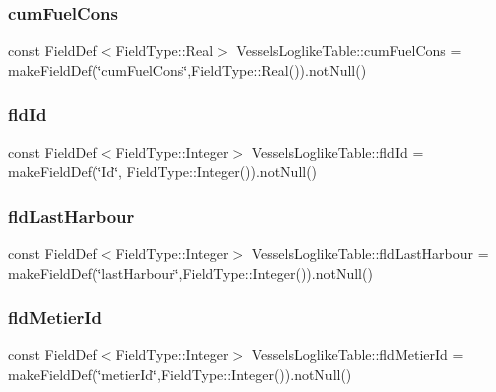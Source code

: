 \mbox{\label{class_vessels_loglike_table_a735694ec1f64a2f3a67e6a72e7d709ad}} 
\subsubsection{\texorpdfstring{cumFuelCons}{cumFuelCons}}
{\footnotesize\ttfamily const Field\+Def$<$Field\+Type\+::\+Real$>$ Vessels\+Loglike\+Table\+::cum\+Fuel\+Cons = make\+Field\+Def(\char`\"{}cum\+Fuel\+Cons\char`\"{},Field\+Type\+::\+Real()).not\+Null()}

\mbox{\label{class_vessels_loglike_table_a2009922216ad19cc583f4ca8a9e40500}} 
\subsubsection{\texorpdfstring{fldId}{fldId}}
{\footnotesize\ttfamily const Field\+Def$<$Field\+Type\+::\+Integer$>$ Vessels\+Loglike\+Table\+::fld\+Id = make\+Field\+Def(\char`\"{}Id\char`\"{}, Field\+Type\+::\+Integer()).not\+Null()}

\mbox{\label{class_vessels_loglike_table_a4551421d1b817e6043b4432b3c517028}} 
\subsubsection{\texorpdfstring{fldLastHarbour}{fldLastHarbour}}
{\footnotesize\ttfamily const Field\+Def$<$Field\+Type\+::\+Integer$>$ Vessels\+Loglike\+Table\+::fld\+Last\+Harbour = make\+Field\+Def(\char`\"{}last\+Harbour\char`\"{},Field\+Type\+::\+Integer()).not\+Null()}

\mbox{\label{class_vessels_loglike_table_a4816c2052f8ace4871c371faaa03f50b}} 
\subsubsection{\texorpdfstring{fldMetierId}{fldMetierId}}
{\footnotesize\ttfamily const Field\+Def$<$Field\+Type\+::\+Integer$>$ Vessels\+Loglike\+Table\+::fld\+Metier\+Id = make\+Field\+Def(\char`\"{}metier\+Id\char`\"{},Field\+Type\+::\+Integer()).not\+Null()}

